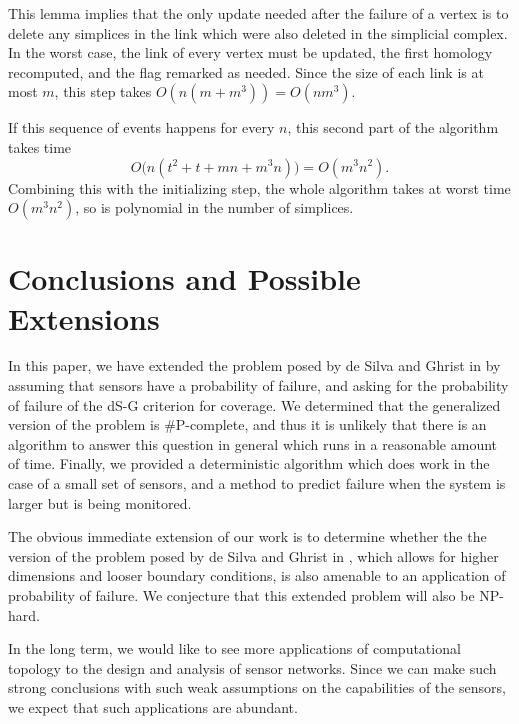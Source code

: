 \documentclass[10pt,twocolumn]{article} \usepackage{amsmath,epsf,amssymb,cite,pifont,amsthm, mathrsfs,epsfig,  bbm, amsthm,  setspace}
\renewcommand{\1}{\mathbbm{1}}
\begin{document}
This lemma implies that the only  update needed after the failure of a vertex is to delete any simplices in the link which were also deleted in the simplicial complex.
In the worst case, the link of every vertex must be updated, the first homology recomputed, and the flag remarked as needed.
Since the size of each link is at most $m$, this step takes $O(n(m+m^3)) = O(nm^3)$.

If this sequence of events happens for every $n$, this second part of the algorithm takes time $$O\bigg(n(t^2+t+mn+m^3n) \bigg) = O(m^3n^2).$$
Combining this with the initializing step, the whole algorithm takes at worst time $O(m^3n^2)$, so is polynomial in the number of simplices.





\section{Conclusions and Possible Extensions}\label{S: Conclusion}

In this paper, we have extended the problem posed by de Silva and Ghrist in \cite{DeSilva2006}
by assuming that  sensors have a probability of failure, and asking for the probability of failure of the dS-G criterion for
coverage.
We determined that the generalized version of the problem is \#P-complete, and thus it is unlikely that there is an
 algorithm to answer this question in general which runs in a reasonable amount of time.
Finally, we provided a deterministic algorithm which does work in the case of a small set of sensors,
and a method to predict failure when the system is larger but is being monitored.

The obvious immediate extension of our work is to determine whether the the version of the problem
posed by de Silva and Ghrist in \cite{DeSilva2007}, which allows for higher dimensions and looser
boundary conditions, is also amenable to an application of probability of failure.
We conjecture that this extended problem will also be NP-hard.

In the long term, we would like to see more applications of computational topology to the
design and analysis of sensor networks.
Since we can make such strong conclusions with such weak assumptions on the capabilities of the sensors,
we expect that such applications are abundant.



	
\end{document}
